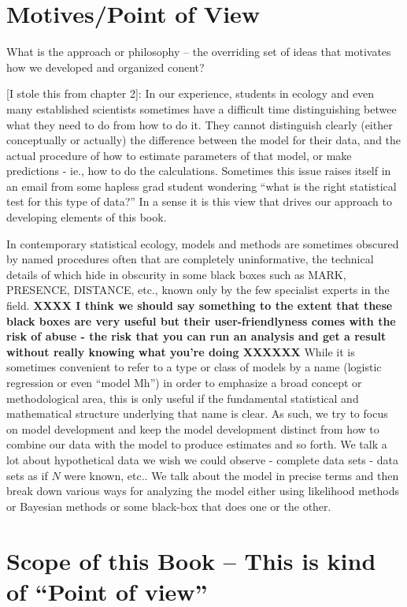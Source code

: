 \section*{Motives/Point of View}

What is the approach or philosophy -- the overriding set of ideas that
motivates how we developed and organized conent?

[I stole this from chapter 2]: 
In our experience, students in ecology
and even many established scientists sometimes have a difficult time
distinguishing betwee what they need to do from how to do it.  They
cannot distinguish clearly (either conceptually or actually) the
difference between the model for their data, and the actual procedure
of how to estimate parameters of that model, or make predictions -
ie., how to do the calculations. Sometimes this issue raises itself in
an email from some hapless grad student wondering ``what is the right
statistical test for this type of data?''  In a sense it is this view
that drives our approach to developing elements of this book.

In contemporary statistical ecology, models and methods are sometimes
obscured by named procedures often that are completely uninformative,
the technical details of which hide in obscurity in some black boxes
such as MARK, PRESENCE, DISTANCE, etc., known only by the few
specialist experts in the field.  {\bf XXXX I think we should say
  something to the extent that these black boxes are very useful but
  their user-friendlyness comes with the risk of abuse - the risk that
  you can run an analysis and get a result without really knowing what
  you're doing XXXXXX}  While it is sometimes convenient to refer to a
type or class of models by a name (logistic regression or even ``model
Mh'') in order to emphasize a broad concept or methodological area,
this is only useful if the fundamental statistical and mathematical
structure underlying that name is clear. As such, we try to focus on
model development and keep the model development distinct from how to
combine our data with the model to produce estimates and so forth. We
talk a lot about hypothetical data we wish we could observe - complete
data sets - data sets as if $N$ were known, etc.. We talk about the
model in precise terms and then break down various ways for analyzing
the model either using likelihood methods or Bayesian methods or some
black-box that does one or the other.



\section{Scope of this Book  
-- This is kind of ``Point of view''}

